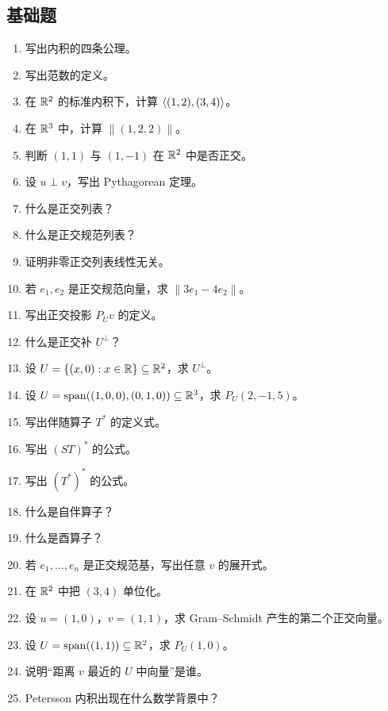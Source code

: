 \subsection*{基础题}
\begin{enumerate}[label=\textbf{\arabic*.}, leftmargin=*, itemsep=0.5em]
\item \basic 写出内积的四条公理。
\item \basic 写出范数的定义。
\item \basic 在 $\mathbb{R}^2$ 的标准内积下，计算 $\langle (1,2), (3,4) \rangle$。
\item \basic 在 $\mathbb{R}^3$ 中，计算 $\|(1,2,2)\|$。
\item \basic 判断 $(1,1)$ 与 $(1,-1)$ 在 $\mathbb{R}^2$ 中是否正交。
\item \basic 设 $u\perp v$，写出 Pythagorean 定理。
\item \basic 什么是正交列表？
\item \basic 什么是正交规范列表？
\item \basic 证明非零正交列表线性无关。
\item \basic 若 $e_1,e_2$ 是正交规范向量，求 $\|3e_1-4e_2\|$。
\item \basic 写出正交投影 $P_Uv$ 的定义。
\item \basic 什么是正交补 $U^{\perp}$？
\item \basic 设 $U=\{(x,0):x\in\mathbb{R}\}\subseteq\mathbb{R}^2$，求 $U^{\perp}$。
\item \basic 设 $U=\operatorname{span}((1,0,0),(0,1,0))\subseteq\mathbb{R}^3$，求 $P_U(2,-1,5)$。
\item \basic 写出伴随算子 $T^*$ 的定义式。
\item \basic 写出 $(ST)^*$ 的公式。
\item \basic 写出 $(T^*)^*$ 的公式。
\item \basic 什么是自伴算子？
\item \basic 什么是酉算子？
\item \basic 若 $e_1,\dots,e_n$ 是正交规范基，写出任意 $v$ 的展开式。
\item \basic 在 $\mathbb{R}^2$ 中把 $(3,4)$ 单位化。
\item \basic 设 $u=(1,0)$，$v=(1,1)$，求 Gram--Schmidt 产生的第二个正交向量。
\item \basic 设 $U=\operatorname{span}((1,1))\subseteq\mathbb{R}^2$，求 $P_U(1,0)$。
\item \basic 说明“距离 $v$ 最近的 $U$ 中向量”是谁。
\item \basic Petersson 内积出现在什么数学背景中？
\end{enumerate}

